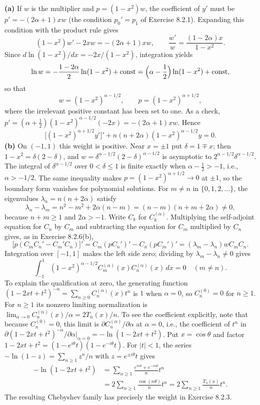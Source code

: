 \textbf{(a)} If $w$ is the multiplier and $p=(1-x^2)w$, the
coefficient of $y'$ must be $p'=-(2\alpha+1)xw$ (the condition
$p_0'=p_1$ of Exercise 8.2.1).  Expanding this
condition with the product rule gives
\[
(1-x^2)w'-2xw=-(2\alpha+1)xw,
\qquad \frac{w'}w=\frac{(1-2\alpha)x}{1-x^2}.
\]
Since $d\ln(1-x^2)/dx=-2x/(1-x^2)$, integration yields
\[
\ln w=-\frac{1-2\alpha}{2}\ln(1-x^2)+\text{const}
=\Bigl(\alpha-\frac12\Bigr)\ln(1-x^2)+\text{const},
\]
so that
\[
w=(1-x^2)^{\alpha-1/2},\qquad p=(1-x^2)^{\alpha+1/2},
\]
where the irrelevant positive constant has been set to one.  As a
check, $p'=(\alpha+\frac12)(1-x^2)^{\alpha-1/2}(-2x)=-(2\alpha+1)xw$.
Hence
\[
\boxed{\bigl[(1-x^2)^{\alpha+1/2}y'\bigr]'
+n(n+2\alpha)(1-x^2)^{\alpha-1/2}y=0}.
\]
\textbf{(b)} On $(-1,1)$ this weight is positive.  Near $x=\pm1$ put
$\delta=1\mp x$; then $1-x^2=\delta(2-\delta)$, and
$w=\delta^{\alpha-1/2}(2-\delta)^{\alpha-1/2}$ is asymptotic to
$2^{\alpha-1/2}\delta^{\alpha-1/2}$.  The integral of
$\delta^{\alpha-1/2}$ over $0<\delta\le1$ is finite exactly when
$\alpha-\frac12>-1$, i.e., $\alpha>-1/2$.  The same inequality
makes $p=(1-x^2)^{\alpha+1/2}\to0$ at $\pm1$, so the boundary form
vanishes for polynomial solutions.
For $m\ne n$ in $\{0,1,2,\ldots\}$, the eigenvalues
$\lambda_n=n(n+2\alpha)$ satisfy
\[
\lambda_n-\lambda_m=n^2-m^2+2\alpha(n-m)=(n-m)(n+m+2\alpha)\ne0,
\]
because $n+m\ge1$ and $2\alpha>-1$.  Write $C_k$ for
$C_k^{(\alpha)}$.  Multiplying the self-adjoint equation for $C_n$ by
$C_m$ and subtracting the equation for $C_m$ multiplied by $C_n$
gives, as in Exercise 8.2.6(b),
\[
\bigl[p(C_mC_n'-C_m'C_n)\bigr]'=C_m(pC_n')'-C_n(pC_m')'
=(\lambda_m-\lambda_n)wC_mC_n.
\]
Integration over $[-1,1]$ makes the left side zero; dividing by
$\lambda_m-\lambda_n\ne0$ gives
\[
\boxed{\int_{-1}^{1}(1-x^2)^{\alpha-1/2}
 C_m^{(\alpha)}(x)C_n^{(\alpha)}(x)\,dx=0\quad(m\ne n)}.
\]
To explain the qualification at zero, the generating function
$(1-2xt+t^2)^{-\alpha}=\sum_{n\ge0}C_n^{(\alpha)}(x)t^n$
is $1$ when $\alpha=0$, so $C_n^{(0)}=0$ for $n\ge1$.  For $n\ge1$
its nonzero limiting normalization
is $\lim_{\alpha\to0}C_n^{(\alpha)}(x)/\alpha=2T_n(x)/n$.
To see the coefficient explicitly, note that because $C_n^{(0)}=0$,
this limit is $\partial C_n^{(\alpha)}/\partial\alpha$ at $\alpha=0$,
i.e., the coefficient of $t^n$ in
$\partial(1-2xt+t^2)^{-\alpha}/\partial\alpha|_{\alpha=0}
=-\ln(1-2xt+t^2)$.  Put $x=\cos\theta$ and factor
$1-2xt+t^2=(1-e^{i\theta}t)(1-e^{-i\theta}t)$. For $|t|<1$, the
series $-\ln(1-z)=\sum_{n\ge1}z^n/n$ with $z=e^{\pm i\theta}t$ gives
\begin{align*}
-\ln(1-2xt+t^2)
&=\sum_{n\ge1}\frac{e^{in\theta}+e^{-in\theta}}n t^n\\
&=2\sum_{n\ge1}\frac{\cos(n\theta)}n t^n
=2\sum_{n\ge1}\frac{T_n(x)}n t^n.
\end{align*}
The resulting Chebyshev family has precisely the weight in
Exercise 8.2.3.


